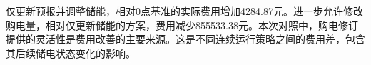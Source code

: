 仅更新预报并调整储能，相对0点基准的实际费用增加4284.87元。进一步允许修改购电量，相对仅更新储能的方案，费用减少855533.38元。本次对照中，购电修订提供的灵活性是费用改善的主要来源。这是不同连续运行策略之间的费用差，包含其后续储电状态变化的影响。